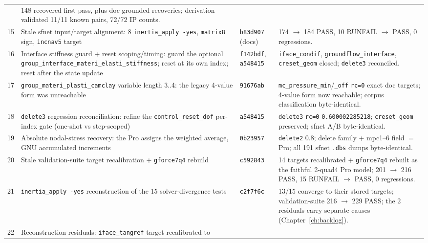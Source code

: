 \documentclass[11pt,a4paper]{report}
\newcommand{\code}[1]{\texttt{#1}}
\begin{document}
\begin{longtable}{@{}r L{5.0cm} L{2.6cm} L{5.6cm}@{}}
  & 148 recovered first pass, plus doc-grounded recoveries; derivation validated
    11/11 known pairs, 72/72 IP counts. \\
15 & Stale sfnet input/target alignment: 8 \code{inertia\_\allowbreak apply -yes},
     \code{matrix8} sign, \code{incnav5} target
  & \code{b83d907} (docs)
  & 174 $\rightarrow$ 184 PASS, 10 RUNFAIL $\rightarrow$ PASS, 0 regressions. \\
16 & Interface stiffness guard + reset scoping/timing: guard the optional
     \code{group\_\allowbreak interface\_\allowbreak materi\_\allowbreak elasti\_\allowbreak stiffness}; reset at its own index;
     reset after the state update
  & \code{f142bdf}, \code{a548415}
  & \code{iface\_\allowbreak condif}, \code{groundflow\_\allowbreak interface}, \code{creset\_\allowbreak geom} closed;
    \code{delete3} reconciled. \\
17 & \code{group\_\allowbreak materi\_\allowbreak plasti\_\allowbreak camclay} variable length 3..4: the legacy 4-value
     form was unreachable
  & \code{91676ab}
  & \code{mc\_\allowbreak pressure\_\allowbreak min}/\code{\_\allowbreak off} \code{rc=0} exact doc targets; 4-value
    form now reachable; corpus classification byte-identical. \\
18 & \code{delete3} regression reconciliation: refine the
     \code{control\_\allowbreak reset\_\allowbreak dof} per-index gate (one-shot vs step-scoped)
  & \code{a548415}
  & \code{delete3} \code{rc=0} \code{0.600002285218}; \code{creset\_\allowbreak geom}
    preserved; sfnet A/B byte-identical. \\
19 & Absolute nodal-stress recovery: the Pro assigns the weighted average, GNU
     accumulated increments
  & \code{0b23957}
  & \code{delete2} $0.8$; delete family + mpc1--6 field $=$ Pro; all 191 sfnet
    \code{.dbs} dumps byte-identical. \\
20 & Stale validation-suite target recalibration + \code{gforce7q4} rebuild
  & \code{c592843}
  & 14 targets recalibrated + \code{gforce7q4} rebuilt as the faithful 2-quad4
    Pro model; 201 $\rightarrow$ 216 PASS, 15 RUNFAIL $\rightarrow$ PASS, 0
    regressions. \\
21 & \code{inertia\_\allowbreak apply -yes} reconstruction of the 15 solver-divergence tests
   & \code{c2f7f6c}
   & 13/15 converge to their stored targets; validation-suite 216 $\rightarrow$
     229 PASS; the 2 residuals carry separate causes (Chapter~\ref{ch:backlog}). \\
22 & Reconstruction residuals: \code{iface\_\allowbreak tangref} target recalibrated to

\end{longtable}
\end{document}
